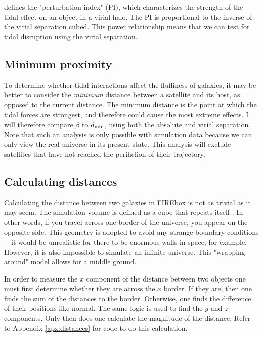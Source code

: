  \cite{jacksonDarkmatterdeficientDwarfGalaxies2021} defines the "perturbation index" (PI), which characterizes the strength of the tidal effect on an object in a virial halo. The PI is proportional to the inverse of the virial separation cubed. This power relationship means that we can test for tidal disruption using the virial separation.

 \subsection{Minimum proximity}

 To determine whether tidal interactions affect the fluffiness of galaxies, it may be better to consider the \emph{minimum} distance between a satellite and its host, as opposed to the current distance. The minimum distance is the point at which the tidal forces are strongest, and therefore could cause the most extreme effects. I will therefore compare $\beta$ to $d_{\rm{min}}$, using both the absolute and virial separation. Note that such an analysis is only possible with simulation data because we can only view the real universe in its present state. This analysis will exclude satellites that have not reached the perihelion of their trajectory.

\subsection{Calculating distances}

Calculating the distance between two galaxies in FIREbox is not as trivial as it may seem. The simulation volume is defined as a cube that repeats itself \citep{feldmannFIREboxSimulatingGalaxies2022}. In other words, if you travel across one border of the universe, you appear on the opposite side. This geometry is adopted to avoid any strange boundary conditions---it would be unrealistic for there to be enormous walls in space, for example. However, it is also impossible to simulate an infinite universe. This "wrapping around" model allows for a middle ground.

In order to measure the $x$ component of the distance between two objects one must first determine whether they are across the $x$ border. If they are, then one finds the sum of the distances to the border. Otherwise, one finds the difference of their positions like normal. The same logic is used to find the $y$ and $z$ components. Only then does one calculate the magnitude of the distance. Refer to Appendix \ref{apx:distances} for code to do this calculation.


